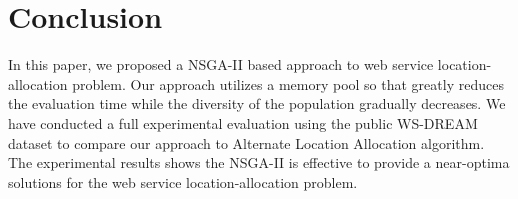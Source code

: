 \documentclass{llncs}
\begin{document}
\section{Conclusion}
In this paper, we proposed a NSGA-II based approach to web service location-allocation problem. 
Our approach utilizes a memory pool so that
greatly reduces the evaluation time while the diversity of the population gradually decreases. We have conducted a full experimental evaluation using the public WS-DREAM dataset to compare our approach to Alternate Location Allocation algorithm. 
The experimental results shows the NSGA-II is effective to provide a near-optima solutions for the web service location-allocation problem.




\end{document}
